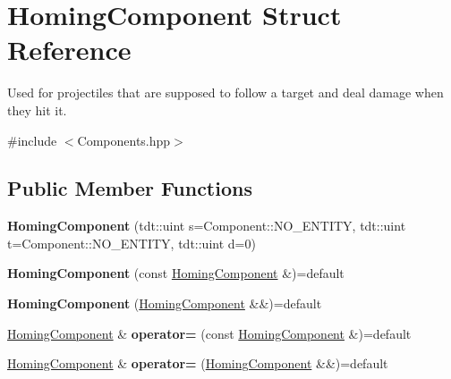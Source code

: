 \hypertarget{struct_homing_component}{}\section{Homing\+Component Struct Reference}
\label{struct_homing_component}


Used for projectiles that are supposed to follow a target and deal damage when they hit it.  




{\ttfamily \#include $<$Components.\+hpp$>$}

\subsection*{Public Member Functions}
\begin{DoxyCompactItemize}
\item 
{\bfseries Homing\+Component} (tdt\+::uint s=Component\+::\+N\+O\+\_\+\+E\+N\+T\+I\+TY, tdt\+::uint t=Component\+::\+N\+O\+\_\+\+E\+N\+T\+I\+TY, tdt\+::uint d=0)\hypertarget{struct_homing_component_ac91b84e8e7333c7244d9a0b983df358f}{}\label{struct_homing_component_ac91b84e8e7333c7244d9a0b983df358f}

\item 
{\bfseries Homing\+Component} (const \hyperlink{struct_homing_component}{Homing\+Component} \&)=default\hypertarget{struct_homing_component_a02790de1d791ee8780f88c4df7e89261}{}\label{struct_homing_component_a02790de1d791ee8780f88c4df7e89261}

\item 
{\bfseries Homing\+Component} (\hyperlink{struct_homing_component}{Homing\+Component} \&\&)=default\hypertarget{struct_homing_component_a9528599a073109a06454ee888232e064}{}\label{struct_homing_component_a9528599a073109a06454ee888232e064}

\item 
\hyperlink{struct_homing_component}{Homing\+Component} \& {\bfseries operator=} (const \hyperlink{struct_homing_component}{Homing\+Component} \&)=default\hypertarget{struct_homing_component_aec9487594754a223fd55717d0a2c677c}{}\label{struct_homing_component_aec9487594754a223fd55717d0a2c677c}

\item 
\hyperlink{struct_homing_component}{Homing\+Component} \& {\bfseries operator=} (\hyperlink{struct_homing_component}{Homing\+Component} \&\&)=default\hypertarget{struct_homing_component_ad7fefeec17705d1f9ad082f401e2ecb1}{}\label{struct_homing_component_ad7fefeec17705d1f9ad082f401e2ecb1}

\end{DoxyCompactItemize}
